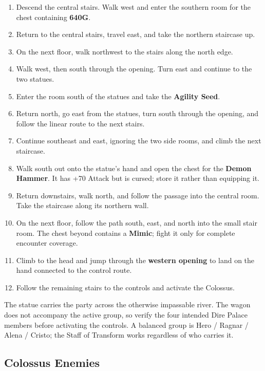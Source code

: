 \documentclass[
  american,
  10pt,
  letterpaper,
  oneside,
  open=any]{scrreprt}
\providecommand{\tightlist}{%
  \setlength{\itemsep}{0pt}\setlength{\parskip}{0pt}}
\begin{document}
\begin{enumerate}
\def\labelenumi{\arabic{enumi}.}
\tightlist
\item
  Descend the central stairs. Walk west and enter the southern room for
  the chest containing \textbf{640G}.
\item
  Return to the central stairs, travel east, and take the northern
  staircase up.
\item
  On the next floor, walk northwest to the stairs along the north edge.
\item
  Walk west, then south through the opening. Turn east and continue to
  the two statues.
\item
  Enter the room south of the statues and take the \textbf{Agility
  Seed}.
\item
  Return north, go east from the statues, turn south through the
  opening, and follow the linear route to the next stairs.
\item
  Continue southeast and east, ignoring the two side rooms, and climb
  the next staircase.
\item
  Walk south out onto the statue's hand and open the chest for the
  \textbf{Demon Hammer}. It has +70 Attack but is cursed; store it
  rather than equipping it.
\item
  Return downstairs, walk north, and follow the passage into the central
  room. Take the staircase along its northern wall.
\item
  On the next floor, follow the path south, east, and north into the
  small stair room. The chest beyond contains a \textbf{Mimic}; fight it
  only for complete encounter coverage.
\item
  Climb to the head and jump through the \textbf{western opening} to
  land on the hand connected to the control route.
\item
  Follow the remaining stairs to the controls and activate the Colossus.
\end{enumerate}

The statue carries the party across the otherwise impassable river. The
wagon does not accompany the active group, so verify the four intended
Dire Palace members before activating the controls. A balanced group is
Hero / Ragnar / Alena / Cristo; the Staff of Transform works regardless
of who carries it.

\subsection{Colossus Enemies}\label{colossus-enemies}
\end{document}
